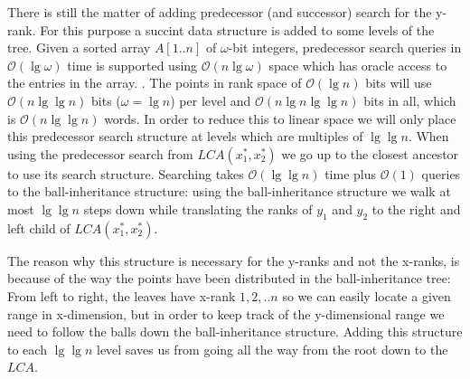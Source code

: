 There is still the matter of adding predecessor (and successor) search for the y-rank.
For this purpose a succint data structure is added to some levels of the tree. Given a sorted array $A[1..n]$ of $\omega$-bit integers, predecessor search queries in $\mathcal{O}(\lg \omega)$ time is supported using $\mathcal{O}(n \lg \omega)$ space which has oracle access to the entries in the array. . The points in rank space of $\mathcal{O}(\lg n)$ bits will use $\mathcal{O}(n \lg \lg n)$ bits ($\omega = \lg n$) per level and $\mathcal{O}(n \lg n \lg \lg n)$ bits in all, which is $\mathcal{O}(n \lg \lg n)$ words. In order to reduce this to linear space we will only place this predecessor search structure at levels which are multiples of $\lg \lg n$. When using the predecessor search from $LCA(x^*_1, x^*_2)$ we go up to the closest ancestor to use its search structure. Searching takes $\mathcal{O}(\lg \lg n)$ time plus $\mathcal{O}(1)$ queries to the ball-inheritance structure: using the ball-inheritance structure we walk at most $\lg \lg n$ steps down while translating the ranks of $y_1$ and $y_2$ to the right and left child of $LCA(x^*_1, x^*_2)$. 

The reason why this structure is necessary for the y-ranks and not the x-ranks, is because of the way the points have been distributed in the ball-inheritance tree: From left to right, the leaves have x-rank $1,2,..n$ so we can easily locate a given range in x-dimension, but in order to keep track of the y-dimensional range we need to follow the balls down the ball-inheritance structure. Adding this structure to each $\lg \lg n$ level saves us from going all the way from the root down to the $LCA$.  \\

